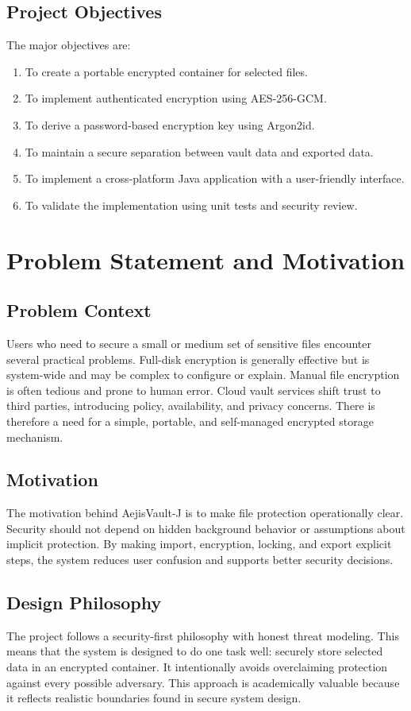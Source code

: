 \documentclass[12pt,a4paper]{report}
\newcommand{\projname}{AejisVault-J}
\begin{document}
\section{Project Objectives}
The major objectives are:
\begin{enumerate}[label=\arabic*.]
  \item To create a portable encrypted container for selected files.
  \item To implement authenticated encryption using AES-256-GCM.
  \item To derive a password-based encryption key using Argon2id.
  \item To maintain a secure separation between vault data and exported data.
  \item To implement a cross-platform Java application with a user-friendly interface.
  \item To validate the implementation using unit tests and security review.
\end{enumerate}

\chapter{Problem Statement and Motivation}
\section{Problem Context}
Users who need to secure a small or medium set of sensitive files encounter several practical problems. Full-disk encryption is generally effective but is system-wide and may be complex to configure or explain. Manual file encryption is often tedious and prone to human error. Cloud vault services shift trust to third parties, introducing policy, availability, and privacy concerns. There is therefore a need for a simple, portable, and self-managed encrypted storage mechanism.

\section{Motivation}
The motivation behind \projname{} is to make file protection operationally clear. Security should not depend on hidden background behavior or assumptions about implicit protection. By making import, encryption, locking, and export explicit steps, the system reduces user confusion and supports better security decisions.

\section{Design Philosophy}
The project follows a security-first philosophy with honest threat modeling. This means that the system is designed to do one task well: securely store selected data in an encrypted container. It intentionally avoids overclaiming protection against every possible adversary. This approach is academically valuable because it reflects realistic boundaries found in secure system design.
\end{document}
